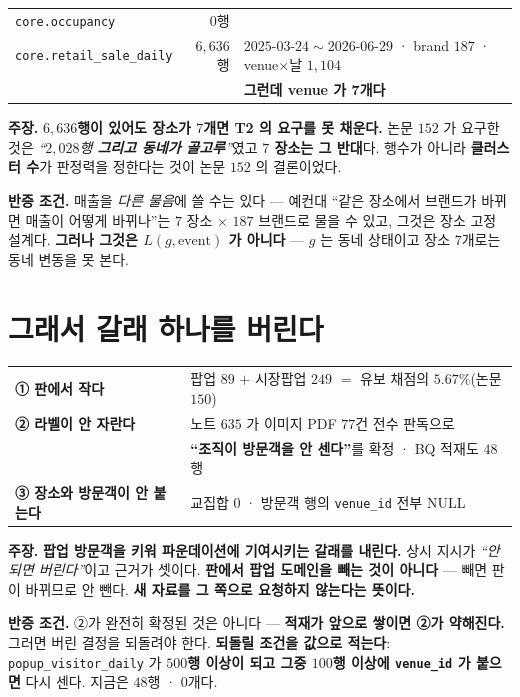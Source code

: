 \documentclass[10pt,a4paper]{article}
\newcommand{\claim}[2]{\begin{claimbox}\textbf{주장.} #1\par\smallskip
  \textcolor{gray!70}{\textbf{반증 조건.} #2}\end{claimbox}}
\begin{document}
\begin{center}
\begin{tabular}{lrl}
\toprule
\texttt{core.occupancy} & $0$행 & \\
\texttt{core.retail\_sale\_daily} & $6{,}636$행 & $2025$-$03$-$24 \sim 2026$-$06$-$29$ ·
brand $187$ · venue$\times$날 $1{,}104$ \\
& & \textbf{그런데 venue 가 $\mathbf{7}$개다} \\
\bottomrule
\end{tabular}
\end{center}

\claim{\textbf{$6{,}636$행이 있어도 장소가 $7$개면 T2 의 요구를 못 채운다.} 논문 $152$ 가
요구한 것은 \emph{``$2{,}028$행 \textbf{그리고 동네가 골고루}''}였고 \textbf{$7$ 장소는
그 반대}다. 행수가 아니라 \textbf{클러스터 수}가 판정력을 정한다는 것이 논문 $152$ 의
결론이었다.}
{매출을 \emph{다른 물음}에 쓸 수는 있다 --- 예컨대 ``같은 장소에서 브랜드가 바뀌면 매출이
어떻게 바뀌나''는 $7$ 장소 $\times$ $187$ 브랜드로 물을 수 있고, 그것은 장소 고정
설계다. \textbf{그러나 그것은 $L(g,\text{event})$ 가 아니다} --- $g$ 는 동네 상태이고
장소 $7$개로는 동네 변동을 못 본다.}

\section{그래서 갈래 하나를 버린다}

\begin{center}
\begin{tabular}{ll}
\toprule
\textbf{① 판에서 작다} & 팝업 $89$ $+$ 시장팝업 $249$ $=$ 유보 채점의 $\mathbf{5.67\%}$(논문 $150$) \\
\textbf{② 라벨이 안 자란다} & 노트 $635$ 가 이미지 PDF $77$건 전수 판독으로 \\
& \textbf{``조직이 방문객을 안 센다''}를 확정 · BQ 적재도 $48$행 \\
\textbf{③ 장소와 방문객이 안 붙는다} & 교집합 $0$ · 방문객 행의 \texttt{venue\_id} 전부 NULL \\
\bottomrule
\end{tabular}
\end{center}

\claim{\textbf{팝업 방문객을 키워 파운데이션에 기여시키는 갈래를 내린다.} 상시 지시가
\emph{``안 되면 버린다''}이고 근거가 셋이다. \textbf{판에서 팝업 도메인을 빼는 것이
아니다} --- 빼면 판이 바뀌므로 안 뺀다. \textbf{새 자료를 그 쪽으로 요청하지 않는다는
뜻이다.}}
{②가 완전히 확정된 것은 아니다 --- \textbf{적재가 앞으로 쌓이면 ②가 약해진다.} 그러면
버린 결정을 되돌려야 한다. \textbf{되돌릴 조건을 값으로 적는다}: \texttt{popup\_visitor\_daily}
가 \textbf{$500$행 이상이 되고 그중 $100$행 이상에 \texttt{venue\_id} 가 붙으면} 다시
센다. 지금은 $48$행 · $0$개다.}
\end{document}
